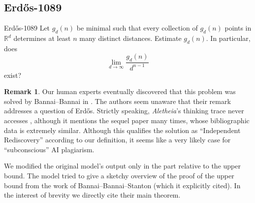 \documentclass{article}
\theoremstyle{plain}
\theoremstyle{definition}
\newtheorem{remark}{Remark}[section]
\newcommand{\Aletheia}{\emph{Aletheia}}
\begin{document}
\subsection{Erdős-1089}

\begin{problem}{Erdős-1089 \cite{Er75f}}
    Let $g_d(n)$ be minimal such that every collection of $g_d(n)$ points in $\mathbb{R}^d$ determines at least $n$ many distinct distances. Estimate $g_d(n)$. In particular, does\[\lim_{d\to \infty}\frac{g_d(n)}{d^{n-1}}\]exist?
\end{problem}


\begin{remark}
Our human experts eventually discovered that this problem was solved by Bannai--Bannai in \cite[Remark 3(ii)]{Bannai81}. The authors seem unaware that their remark addresses a question of Erdős. 
Strictly speaking, {\Aletheia}'s thinking trace never accesses \cite{Bannai81}, although it mentions the sequel paper \cite{BBS83} many times, whose bibliographic data is extremely similar. Although this qualifies the solution as ``Independent Rediscovery'' according to our definition, it seems like a very likely case for ``subconscious'' AI plagiarism. 

We modified the original model's output only in the part relative to the upper bound. The model tried to give a sketchy overview of the proof of the upper bound from the work of Bannai--Bannai--Stanton (which it explicitly cited). In the interest of brevity we directly cite their main theorem. 
\end{remark}
\end{document}

